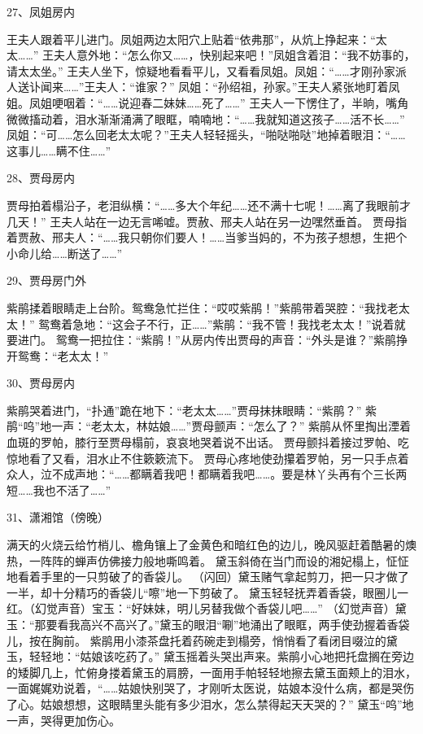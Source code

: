 27、凤姐房内\par
王夫人跟着平儿进门。凤姐两边太阳穴上贴着“依弗那”，从炕上挣起来：“太太……”
王夫人意外地：“怎么你又……，快别起来吧！”凤姐含着泪：“我不妨事的，请太太坐。”
王夫人坐下，惊疑地看看平儿，又看看凤姐。凤姐：“……才刚孙家派人送讣闻来……”王夫人：“谁家？” 
凤姐：“孙绍祖，孙家。”王夫人紧张地盯着凤姐。凤姐哽咽着：“……说迎春二妹妹……死了……” 
王夫人一下愣住了，半晌，嘴角微微搐动着，泪水渐渐涌满了眼眶，喃喃地：“……我就知道这孩子……活不长……” 
凤姐：“可……怎么回老太太呢？”王夫人轻轻摇头，“啪哒啪哒”地掉着眼泪：“……这事儿……瞒不住……”

28、贾母房内\par
贾母拍着榻沿子，老泪纵横：“……多大个年纪……还不满十七呢！……离了我眼前才几天！”
王夫人站在一边无言唏嘘。贾赦、邢夫人站在另一边嘿然垂首。
贾母指着贾赦、邢夫人：“……我只朝你们要人！……当爹当妈的，不为孩子想想，生把个小命儿给……断送了……”

29、贾母房门外\par
紫鹃揉着眼睛走上台阶。鸳鸯急忙拦住：“哎哎紫鹃！”紫鹃带着哭腔：“我找老太太！” 
鸳鸯着急地：“这会子不行，正……”紫鹃：“我不管！我找老太太！”说着就要进门。
鸳鸯一把拉住：“紫鹃！”从房内传出贾母的声音：“外头是谁？”紫鹃挣开鸳鸯：“老太太！” 

30、贾母房内\par
紫鹃哭着进门，“扑通”跪在地下：“老太太……”贾母抹抹眼睛：“紫鹃？” 
紫鹃“呜”地一声：“老太太，林姑娘……”贾母颤声：“怎么了？” 
紫鹃从怀里掏出湮着血斑的罗帕，膝行至贾母榻前，哀哀地哭着说不出话。 
贾母颤抖着接过罗帕、吃惊地看了又看，泪水止不住簌簌流下。 
贾母心疼地使劲攥着罗帕，另一只手点着众人，泣不成声地：“……都瞒着我吧！都瞒着我吧……。要是林丫头再有个三长两短……我也不活了……”

31、潇湘馆（傍晚）\par 
满天的火烧云给竹梢儿、檐角镶上了金黄色和暗红色的边儿，晚风驱赶着酷暑的燠热，一阵阵的蝉声仿佛接力般地嘶鸣着。
黛玉斜倚在当门而设的湘妃榻上，怔怔地看着手里的一只剪破了的香袋儿。 
（闪回）黛玉赌气拿起剪刀，把一只才做了一半，却十分精巧的香袋儿“嚓”地一下剪破了。
黛玉轻轻抚弄着香袋，眼圈儿一红。（幻觉声音）宝玉：“好妹妹，明儿另替我做个香袋儿吧……” 
（幻觉声音）黛玉：“那要看我高兴不高兴了。”黛玉的眼泪“唰”地涌出了眼眶，两手使劲握着香袋儿，按在胸前。 
紫鹃用小漆茶盘托着药碗走到榻旁，悄悄看了看闭目啜泣的黛玉，轻轻地：“姑娘该吃药了。” 
黛玉摇着头哭出声来。紫鹃小心地把托盘搁在旁边的矮脚几上，忙俯身搂着黛玉的肩膀，一面用手帕轻轻地擦去黛玉面颊上的泪水，
一面娓娓劝说着，“……姑娘快别哭了，才刚听太医说，姑娘本没什么病，都是哭伤了心。姑娘想想，这眼睛里头能有多少泪水，怎么禁得起天天哭的？”
黛玉“呜”地一声，哭得更加伤心。

